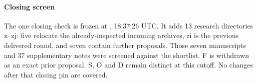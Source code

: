 \paragraph{Closing screen} The one closing check is frozen at , 18:37:26 UTC. It adds 13 research directories x--zj: five relocate the already-inspected incoming archives, zi is the previous delivered round, and seven contain further proposals. Those seven manuscripts and 37 supplementary notes were screened against the shortlist. F is withdrawn as an exact prior proposal. S, O and D remain distinct at this cutoff. No changes after that closing pin are covered.
